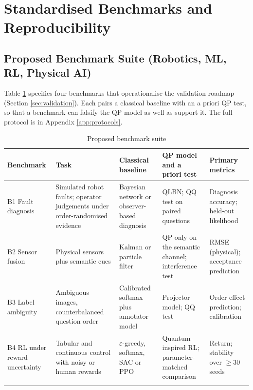 \documentclass[pdflatex,sn-basic]{sn-jnl}
\begin{document}
\section{Standardised Benchmarks and Reproducibility}\label{sec:bench}

\subsection{Proposed Benchmark Suite (Robotics, ML, RL, Physical AI)}
Table \ref{tab:bench} specifies four benchmarks that operationalise the validation roadmap (Section \ref{sec:validation}). Each pairs a classical baseline with an a priori QP test, so that a benchmark can falsify the QP model as well as support it. The full protocol is in Appendix \ref{app:protocols}.

\begin{table}[ht]
\caption{Proposed benchmark suite}\label{tab:bench}%
\footnotesize
\begin{tabular}{@{}>{\raggedright\arraybackslash}p{0.160\dimexpr\textwidth-10\tabcolsep\relax}>{\raggedright\arraybackslash}p{0.240\dimexpr\textwidth-10\tabcolsep\relax}>{\raggedright\arraybackslash}p{0.200\dimexpr\textwidth-10\tabcolsep\relax}>{\raggedright\arraybackslash}p{0.200\dimexpr\textwidth-10\tabcolsep\relax}>{\raggedright\arraybackslash}p{0.200\dimexpr\textwidth-10\tabcolsep\relax}@{}}
\toprule
\textbf{Benchmark} & \textbf{Task} & \textbf{Classical baseline} & \textbf{QP model and a priori test} & \textbf{Primary metrics} \\ \midrule
B1 Fault diagnosis & Simulated robot faults; operator judgements under order-randomised evidence & Bayesian network or observer-based diagnosis & QLBN; QQ test on paired questions & Diagnosis accuracy; held-out likelihood \\
B2 Sensor fusion & Physical sensors plus semantic cues & Kalman or particle filter & QP only on the semantic channel; interference test & RMSE (physical); acceptance prediction \\
B3 Label ambiguity & Ambiguous images, counterbalanced question order & Calibrated softmax plus annotator model & Projector model; QQ test & Order-effect prediction; calibration \\
B4 RL under reward uncertainty & Tabular and continuous control with noisy or human rewards & $\varepsilon$-greedy, softmax, SAC or PPO & Quantum-inspired RL; parameter-matched comparison & Return; stability over $\geq 30$ seeds \\
\botrule
\end{tabular}
\end{table}
\end{document}
